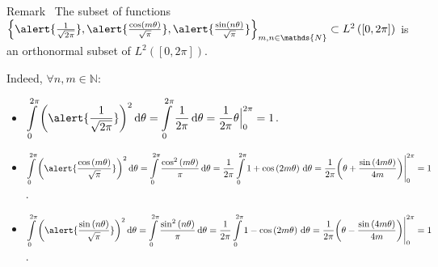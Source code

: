 \begin{frame}
	\frametitle{\secname}
	\begin{block}{Remark~\cite{Herman2021}}
		The subset of functions
		\begin{math}
			{\left\{
				\alert{\frac{1}{\sqrt{2\pi}}},
				\alert{\frac{\cos\left(m\theta\right)}{\sqrt{\pi}}},
				\alert{\frac{\sin\left(n\theta\right)}{\sqrt{\pi}}}
				\right\}}_{m,n\in\mathds{N}}\subset
			L^{2}\left(\left[0,2\pi\right]\right)
		\end{math}
		is an orthonormal subset of
		\begin{math}
			L^{2}\left(\left[0,2\pi\right]\right)
		\end{math}.

		Indeed, $\forall n,m\in\mathds{N}$:
		\begin{itemize}
			\item

			      \begin{math}
				      \displaystyle
				      \int\limits_{0}^{2\pi}
				      {
				      \left(
				      \alert{\frac{1}{\sqrt{2\pi}}}
				      \right)
				      }^{2}
				      \dl\theta=
				      \int\limits_{0}^{2\pi}
				      \frac{1}{2\pi}
				      \dl\theta=
				      \frac{1}{2\pi}
				      {
					      \theta
					      \Bigr|
				      }_{0}^{2\pi}
				      =1
			      \end{math}.

			\item

			      \begin{math}
				      \displaystyle
				      \int\limits_{0}^{2\pi}
				      {
				      \left(
				      \alert{\frac{\cos\left(m\theta\right)}{\sqrt{\pi}}}
				      \right)
				      }^{2}
				      \dl\theta=
				      \int\limits_{0}^{2\pi}
				      \frac{\cos^{2}\left(m\theta\right)}{\pi}
				      \dl\theta=
				      \frac{1}{2\pi}
				      \int\limits_{0}^{2\pi}
				      1+\cos\left(2m\theta\right)
				      \dl\theta=
				      \frac{1}{2\pi}
				      {
					      \left(
					      \theta+
					      \frac{\sin\left(4m\theta\right)}{4m}
					      \right)
					      \Biggr|
				      }_{0}^{2\pi}
				      =1
			      \end{math}.

			\item

			      \begin{math}
				      \displaystyle
				      \int\limits_{0}^{2\pi}
				      {
				      \left(
				      \alert{\frac{\sin\left(n\theta\right)}{\sqrt{\pi}}}
				      \right)
				      }^{2}
				      \dl\theta=
				      \int\limits_{0}^{2\pi}
				      \frac{\sin^{2}\left(n\theta\right)}{\pi}
				      \dl\theta=
				      \frac{1}{2\pi}
				      \int\limits_{0}^{2\pi}
				      1-\cos\left(2m\theta\right)
				      \dl\theta=
				      \frac{1}{2\pi}
				      {
					      \left(
					      \theta-
					      \frac{\sin\left(4m\theta\right)}{4m}
					      \right)
					      \Biggr|
				      }_{0}^{2\pi}
				      =1
			      \end{math}.
		\end{itemize}


\end{block}
\end{frame}
